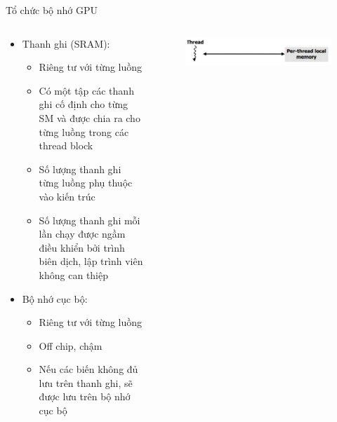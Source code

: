 \documentclass[10pt]{beamer}
\theoremstyle{remark}
\numberwithin{algocf}{section}
\numberwithin{equation}{section}
\numberwithin{dl}{section}
\numberwithin{figure}{section}
\begin{document}
\begin{frame}{Tổ chức bộ nhớ GPU}
    \begin{columns}[onlytextwidth]
        \begin{column}{0.5\linewidth}
            \begin{itemize}
                \item Thanh ghi (SRAM):
                \begin{itemize}
                    \item Riêng tư với từng luồng
                    \item Có một tập các thanh ghi cố định cho từng SM và được chia ra cho từng luồng trong các thread block 
                    \item Số lượng thanh ghi từng luồng phụ thuộc vào kiến trúc
                    \item Số lượng thanh ghi mỗi lần chạy được ngầm điều khiển bởi trình biên dịch, lập trình viên không can thiệp
                \end{itemize}
                \item Bộ nhớ cục bộ:
                \begin{itemize}
                    \item Riêng tư với từng luồng
                    \item Off chip, chậm
                    \item Nếu các biến không đủ lưu trên thanh ghi, sẽ được lưu trên bộ nhớ cục bộ
                \end{itemize}
            \end{itemize}
        \end{column}
        \begin{column}{0.5\linewidth}
            \begin{figure}[H]
                \centering
                \includegraphics[width=0.7\linewidth]{figures/CUDA/GPU_Per_Thread_Memory.png}
            \end{figure}
        \end{column}
    \end{columns}
\end{frame}
\end{document}

